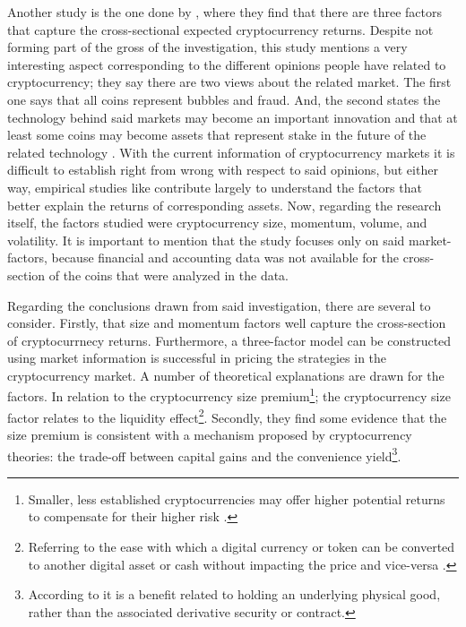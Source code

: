 Another study is the one done by \parencite{liu2022common}, where they find that there are three factors that capture the cross-sectional expected cryptocurrency returns. Despite not forming part of the gross of the investigation, this study mentions a very interesting aspect corresponding to the different opinions people have related to cryptocurrency; they say there are two views about the related market. The first one says that all coins represent bubbles and fraud. And, the second states the technology behind said markets may become an important innovation and that at least some coins may become assets that represent stake in the future of the related technology \parencite{liu2022common}. With the current information of cryptocurrency markets it is difficult to establish right from wrong with respect to said opinions, but either way, empirical studies like \parencite{liu2022common} contribute largely to understand the factors that better explain the returns of corresponding assets. Now, regarding the research itself, the factors studied were cryptocurrency size, momentum, volume, and volatility. It is important to mention that the study focuses only on said market-factors, because financial and accounting data was not available for the cross-section of the coins that were analyzed in the data.

Regarding the conclusions drawn from said investigation, there are several to consider. Firstly, that size and momentum factors well capture the cross-section of cryptocurrnecy returns. Furthermore, a three-factor model can be constructed using market information is successful in pricing the strategies in the cryptocurrency market. A number of theoretical explanations are drawn for the factors. In relation to the cryptocurrency size premium\footnote{Smaller, less established cryptocurrencies may offer higher potential returns to compensate for their higher risk \parencite{Statista2023}.}; the cryptocurrency size factor relates to the liquidity effect\footnote{Referring to the ease with which a digital currency or token can be converted to another digital asset or cash without impacting the price and vice-versa \parencite{CFI_nodate}.}. Secondly, they find some evidence that the size premium is consistent with a mechanism proposed by cryptocurrency theories: the trade-off between capital gains and the convenience yield\footnote{According to \parencite{Investopedia2021} it is a benefit related to holding an underlying physical good, rather than the associated derivative security or contract.}.

